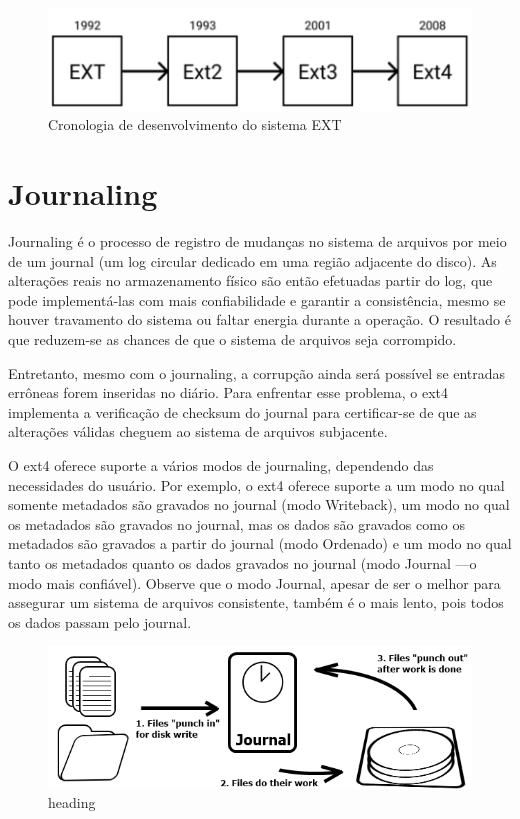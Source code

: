\documentclass[
	12pt,				%
	openright,			%
	oneside,			%
	a4paper,			%
	chapter=TITLE,		%
	english,			%
	french,				%
	spanish,			%
	brazil				%
	]{abntex2}
\theoremstyle{definition}
\begin{document}
\begin{figure}[H]
	\centering
	\includegraphics[width=1.0\textwidth]{ext.png}
	\caption{Cronologia de desenvolvimento do sistema EXT}
	\label{fig:ext}
\end{figure}

\section{Journaling}

Journaling é o processo de registro de mudanças no sistema de arquivos por meio de um journal (um log circular dedicado em uma região adjacente do disco). As alterações reais no armazenamento físico são então efetuadas partir do log, que pode implementá-las com mais confiabilidade e garantir a consistência, mesmo se houver travamento do sistema ou faltar energia durante a operação. O resultado é que reduzem-se as chances de que o sistema de arquivos seja corrompido.

Entretanto, mesmo com o journaling, a corrupção ainda será possível se entradas errôneas forem inseridas no diário. Para enfrentar esse problema, o ext4 implementa a verificação de checksum do journal para certificar-se de que as alterações válidas cheguem ao sistema de arquivos subjacente.

O ext4 oferece suporte a vários modos de journaling, dependendo das necessidades do usuário. Por exemplo, o ext4 oferece suporte a um modo no qual somente metadados são gravados no journal (modo Writeback), um modo no qual os metadados são gravados no journal, mas os dados são gravados como os metadados são gravados a partir do journal (modo Ordenado) e um modo no qual tanto os metadados quanto os dados gravados no journal (modo Journal —o modo mais confiável). Observe que o modo Journal, apesar de ser o melhor para assegurar um sistema de arquivos consistente, também é o mais lento, pois todos os dados passam pelo journal.

\begin{figure}[H]
	\centering
	\includegraphics[width=1.0\textwidth]{journaling.png}
	\caption{heading}
	\label{fig:journaling}
\end{figure}
\end{document}
